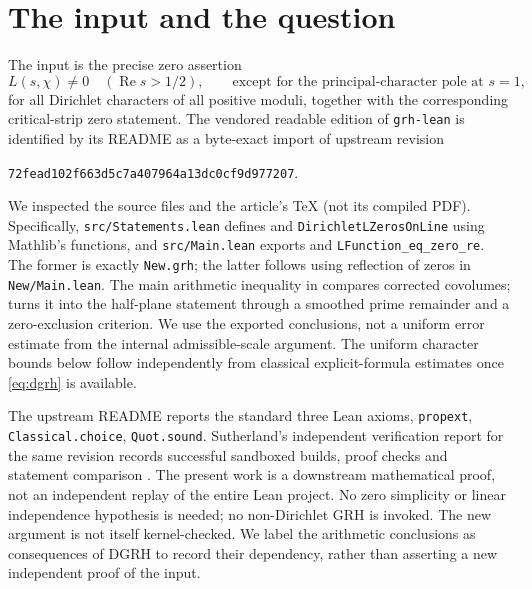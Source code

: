 \documentclass[11pt]{article}
\theoremstyle{remark}\newtheorem{remark}[theorem]{Remark}
\newcommand{\Rea}{\operatorname{Re}}
\begin{document}
\section{The input and the question}
The input is the precise zero assertion
\begin{equation}\tag{DGRH}\label{eq:dgrh}
 L(s,\chi)\ne0\quad(\Rea s>1/2),
 \qquad\text{except for the principal-character pole at }s=1,
\end{equation}
for all Dirichlet characters of all positive moduli, together with the corresponding critical-strip zero statement. The vendored readable edition of \texttt{grh-lean} \cite{Lean} is identified by its README as a byte-exact import of upstream revision
\begin{center}\small\texttt{72fead102f663d5c7a407964a13dc0cf9d977207}.\end{center}
We inspected the source files and the article's TeX (not its compiled PDF). Specifically, \texttt{src/Statements.lean} defines \newline and \texttt{DirichletLZerosOnLine} using Mathlib's functions, and \texttt{src/Main.lean} exports  and \texttt{LFunction\_eq\_zero\_re}. The former is exactly \texttt{New.grh}; the latter follows using reflection of zeros in \texttt{New/Main.lean}. The main arithmetic inequality in  compares corrected covolumes;  turns it into the half-plane statement through a smoothed prime remainder and a zero-exclusion criterion. We use the exported conclusions, not a uniform error estimate from the internal admissible-scale argument. The uniform character bounds below follow independently from classical explicit-formula estimates once \eqref{eq:dgrh} is available.

The upstream README reports the standard three Lean axioms, \texttt{propext}, \texttt{Classical.choice}, \texttt{Quot.sound}. Sutherland's independent verification report for the same revision records successful sandboxed builds, proof checks and statement comparison \cite{Suth}. The present work is a downstream mathematical proof, not an independent replay of the entire Lean project. No zero simplicity or linear independence hypothesis is needed; no non-Dirichlet GRH is invoked. The new argument is not itself kernel-checked. We label the arithmetic conclusions as consequences of DGRH to record their dependency, rather than asserting a new independent proof of the input.
\end{document}
